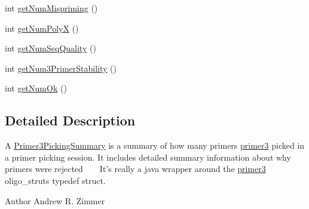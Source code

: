 \begin{DoxyCompactItemize}
\item 
int \hyperlink{interfacebroad_1_1core_1_1primer3_1_1_primer3_picking_summary_a64ab4f797b5e0d7883d3fb74db99ba5c}{get\+Num\+Mispriming} ()
\item 
int \hyperlink{interfacebroad_1_1core_1_1primer3_1_1_primer3_picking_summary_a2f9cc932b398ae64414cf83c3280a82e}{get\+Num\+Poly\+X} ()
\item 
int \hyperlink{interfacebroad_1_1core_1_1primer3_1_1_primer3_picking_summary_a70e5c63abd3a583acff30b5b801eeeab}{get\+Num\+Seq\+Quality} ()
\item 
int \hyperlink{interfacebroad_1_1core_1_1primer3_1_1_primer3_picking_summary_a95545d2c4807cd023ef5e4627fc1ca5c}{get\+Num3\+Primer\+Stability} ()
\item 
int \hyperlink{interfacebroad_1_1core_1_1primer3_1_1_primer3_picking_summary_ab975ff3f9887d1538445df2d13d825a5}{get\+Num\+Ok} ()
\end{DoxyCompactItemize}


\subsection{Detailed Description}
A \hyperlink{interfacebroad_1_1core_1_1primer3_1_1_primer3_picking_summary}{Primer3\+Picking\+Summary} is a summary of how many primers \hyperlink{namespacebroad_1_1core_1_1primer3}{primer3} picked in a primer picking session. It includes detailed summary information about why primers were rejected ~\newline
~\newline
 It's really a java wrapper around the \hyperlink{namespacebroad_1_1core_1_1primer3}{primer3} oligo\+\_\+struts typedef struct. \begin{DoxyAuthor}{Author}
Andrew R. Zimmer 
\end{DoxyAuthor}


